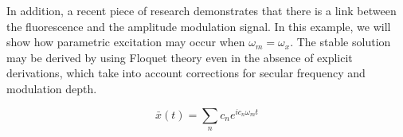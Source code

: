 In addition, a recent piece of research demonstrates that there is a link between the fluorescence and the amplitude modulation signal. In this example, we will show how parametric excitation may occur when \(\omega_m=\omega_x\). The stable solution may be derived by using Floquet theory even in the absence of explicit derivations, which take into account corrections for secular frequency and modulation depth.

\begin{equation}
    \bar{x}(t)=\sum_nc_ne^{ic_n\omega_mt}
\end{equation}



